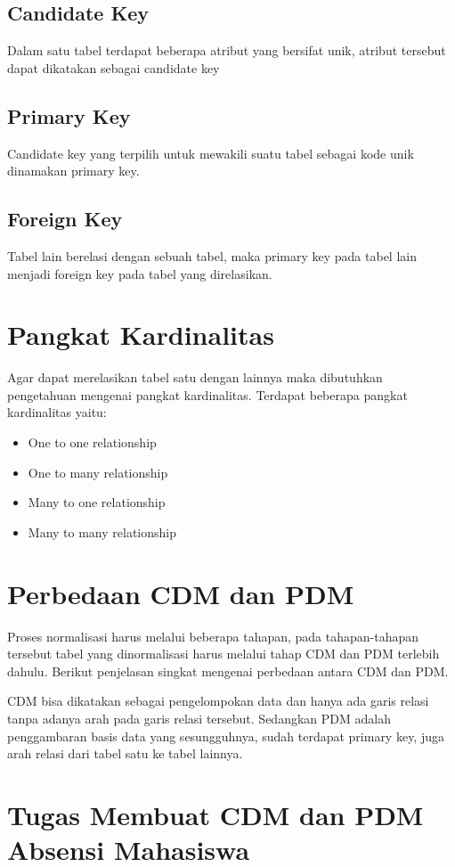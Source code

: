 \documentclass[a4paper,12pt] {article}
\begin{document}
\subsection{Candidate Key}
Dalam satu tabel terdapat beberapa atribut yang bersifat unik, atribut tersebut dapat dikatakan sebagai candidate key
\subsection{Primary Key}
Candidate key yang terpilih untuk mewakili suatu tabel sebagai kode unik dinamakan primary key.
\subsection{Foreign Key}
Tabel lain berelasi dengan sebuah tabel, maka primary key pada tabel lain menjadi foreign key pada tabel yang direlasikan.

\section{Pangkat Kardinalitas}
Agar dapat merelasikan tabel satu dengan lainnya maka dibutuhkan pengetahuan mengenai pangkat kardinalitas. Terdapat beberapa pangkat kardinalitas yaitu:
\begin{itemize}
\item One to one relationship
\item One to many relationship
\item Many to one relationship
\item Many to many relationship
\end{itemize}

\section{Perbedaan CDM dan PDM}
Proses normalisasi harus melalui beberapa tahapan, pada tahapan-tahapan tersebut tabel yang dinormalisasi harus melalui tahap CDM dan PDM terlebih dahulu. Berikut penjelasan singkat mengenai perbedaan antara CDM dan PDM.
\par CDM bisa dikatakan sebagai pengelompokan data dan hanya ada garis relasi tanpa adanya arah pada garis relasi tersebut. Sedangkan PDM adalah penggambaran basis data yang sesungguhnya, sudah terdapat primary key, juga arah relasi dari tabel satu ke tabel lainnya.

\section{Tugas Membuat CDM dan PDM Absensi Mahasiswa}
\end{document}
